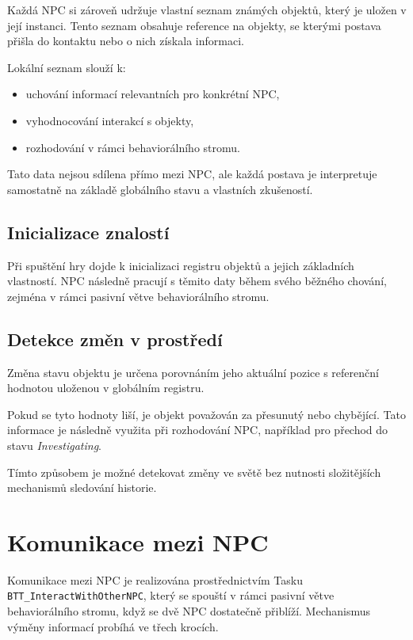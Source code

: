 Každá NPC si zároveň udržuje vlastní seznam známých objektů, který je uložen v její instanci. 
Tento seznam obsahuje reference na objekty, se kterými postava přišla do kontaktu nebo o nich získala informaci.

Lokální seznam slouží k:
\begin{itemize}
    \item uchování informací relevantních pro konkrétní NPC,
    \item vyhodnocování interakcí s objekty,
    \item rozhodování v rámci behaviorálního stromu.
\end{itemize}

Tato data nejsou sdílena přímo mezi NPC, ale každá postava je interpretuje samostatně na základě 
globálního stavu a vlastních zkušeností.

\subsection{Inicializace znalostí}

Při spuštění hry dojde k inicializaci registru objektů a jejich základních vlastností. 
NPC následně pracují s těmito daty během svého běžného chování, zejména v rámci pasivní větve behaviorálního stromu.

\subsection{Detekce změn v prostředí}

Změna stavu objektu je určena porovnáním jeho aktuální pozice s referenční hodnotou uloženou v globálním registru.

Pokud se tyto hodnoty liší, je objekt považován za přesunutý nebo chybějící. 
Tato informace je následně využita při rozhodování NPC, například pro přechod do stavu \textit{Investigating}.

Tímto způsobem je možné detekovat změny ve světě bez nutnosti složitějších mechanismů sledování historie.

\section{Komunikace mezi NPC}

Komunikace mezi NPC je realizována prostřednictvím Tasku \texttt{BTT\_InteractWithOtherNPC}, který se spouští v rámci pasivní větve behaviorálního stromu, když se dvě NPC dostatečně přiblíží. 
Mechanismus výměny informací probíhá ve třech krocích.

